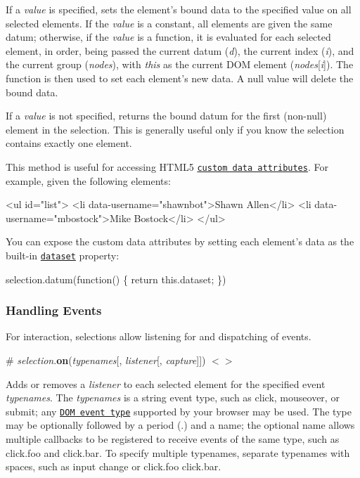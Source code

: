 If a {\itshape value} is specified, sets the element’s bound data to the specified value on all selected elements. If the {\itshape value} is a constant, all elements are given the same datum; otherwise, if the {\itshape value} is a function, it is evaluated for each selected element, in order, being passed the current datum ({\itshape d}), the current index ({\itshape i}), and the current group ({\itshape nodes}), with {\itshape this} as the current D\+OM element ({\itshape nodes}\mbox{[}{\itshape i}\mbox{]}). The function is then used to set each element’s new data. A null value will delete the bound data.

If a {\itshape value} is not specified, returns the bound datum for the first (non-\/null) element in the selection. This is generally useful only if you know the selection contains exactly one element.

This method is useful for accessing H\+T\+M\+L5 \href{http://www.w3.org/TR/html5/dom.html#custom-data-attribute}{\tt custom data attributes}. For example, given the following elements\+:


\begin{DoxyCode}
<ul id="list">
  <li data-username="shawnbot">Shawn Allen</li>
  <li data-username="mbostock">Mike Bostock</li>
</ul>
\end{DoxyCode}


You can expose the custom data attributes by setting each element’s data as the built-\/in \href{http://www.w3.org/TR/html5/dom.html#dom-dataset}{\tt dataset} property\+:


\begin{DoxyCode}
selection.datum(function() \{ return this.dataset; \})
\end{DoxyCode}


\subsubsection*{Handling Events}

For interaction, selections allow listening for and dispatching of events.

\label{_selection_on}%
\# {\itshape selection}.{\bfseries on}({\itshape typenames}\mbox{[}, {\itshape listener}\mbox{[}, {\itshape capture}\mbox{]}\mbox{]}) \href{https://github.com/d3/d3-selection/blob/master/src/selection/on.js}{\tt $<$$>$}

Adds or removes a {\itshape listener} to each selected element for the specified event {\itshape typenames}. The {\itshape typenames} is a string event type, such as {\ttfamily click}, {\ttfamily mouseover}, or {\ttfamily submit}; any \href{https://developer.mozilla.org/en-US/docs/Web/Events#Standard_events}{\tt D\+OM event type} supported by your browser may be used. The type may be optionally followed by a period ({\ttfamily .}) and a name; the optional name allows multiple callbacks to be registered to receive events of the same type, such as {\ttfamily click.\+foo} and {\ttfamily click.\+bar}. To specify multiple typenames, separate typenames with spaces, such as {\ttfamily input change} or {\ttfamily click.\+foo click.\+bar}.

